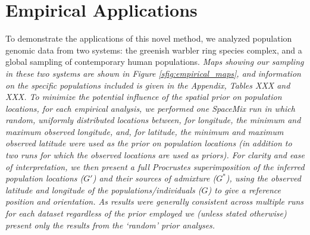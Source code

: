 \documentclass[12pt]{article}
\newcommand{\identifyadmixsource}[1]{{#1^{*}}}
\newcommand{\gb}[1]{{\em \color{magenta} #1}}
\begin{document}
\section*{Empirical Applications}
To demonstrate the applications of this novel method, we analyzed population genomic data from two systems: the greenish warbler ring species complex, and a global sampling of contemporary human populations.  \gb{Maps showing our sampling in these two systems are shown in Figure \ref{sfig:empirical_maps}, and information on the specific populations included is given in the Appendix, Tables XXX and XXX.  To minimize the potential influence of the spatial prior on population locations, for each empirical analysis, we performed one SpaceMix run in which random, uniformly distributed locations between, for longitude, the minimum and maximum observed longitude, and, for latitude, the minimum and maximum observed latitude were used as the prior on population locations (in addition to two runs for which the observed locations are used as priors).  For clarity and ease of interpretation, we then present a full Procrustes superimposition of the inferred population locations ($G'$) and their sources of admixture ($\identifyadmixsource{G}$), using the observed latitude and longitude of the populations/individuals ($G$) to give a reference position and orientation.  As results were generally consistent across multiple runs for each dataset regardless of the prior employed we (unless stated otherwise) present only the results from the `random' prior analyses.}
\end{document}
